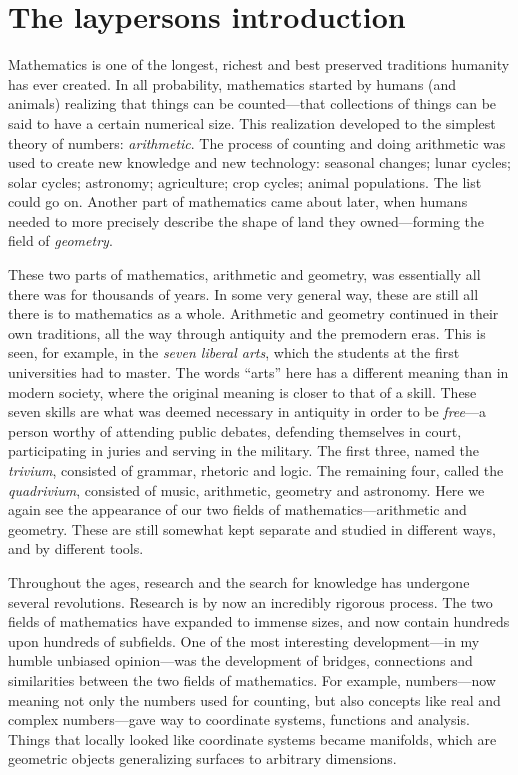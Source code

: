 
\section{The laypersons introduction}

Mathematics is one of the longest, richest and best preserved traditions humanity has ever created. In all probability, mathematics started by humans (and animals) realizing that things can be counted---that collections of things can be said to have a certain numerical size. This realization developed to the simplest theory of numbers: \emph{arithmetic}. The process of counting and doing arithmetic was used to create new knowledge and new technology: seasonal changes; lunar cycles; solar cycles; astronomy; agriculture; crop cycles; animal populations. The list could go on. Another part of mathematics came about later, when humans needed to more precisely describe the shape of land they owned---forming the field of \emph{geometry}. 

These two parts of mathematics, arithmetic and geometry, was essentially all there was for thousands of years. In some very general way, these are still all there is to mathematics as a whole. Arithmetic and geometry continued in their own traditions, all the way through antiquity and the premodern eras. This is seen, for example, in the \emph{seven liberal arts}, which the students at the first universities had to master. The words ``arts'' here has a different meaning than in modern society, where the original meaning is closer to that of a skill. These seven skills are what was deemed necessary in antiquity in order to be \emph{free}---a person worthy of attending public debates, defending themselves in court, participating in juries and serving in the military. The first three, named the \emph{trivium}, consisted of grammar, rhetoric and logic. The remaining four, called the \emph{quadrivium}, consisted of music, arithmetic, geometry and astronomy. Here we again see the appearance of our two fields of mathematics---arithmetic and geometry. These are still somewhat kept separate and studied in different ways, and by different tools. 

Throughout the ages, research and the search for knowledge has undergone several revolutions. Research is by now an incredibly rigorous process. The two fields of mathematics have expanded to immense sizes, and now contain hundreds upon hundreds of subfields. One of the most interesting development---in my humble unbiased opinion---was the development of bridges, connections and similarities between the two fields of mathematics. For example, numbers---now meaning not only the numbers used for counting, but also concepts like real and complex numbers---gave way to coordinate systems, functions and analysis. Things that locally looked like coordinate systems became manifolds, which are geometric objects generalizing surfaces to arbitrary dimensions. 

